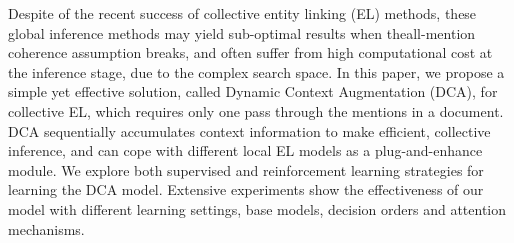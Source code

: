 Despite of the recent success of collective entity linking (EL) methods, these global inference methods may yield sub-optimal results when theall-mention coherence assumption breaks, and often suffer from high computational cost at the inference stage, due to the complex search space. In this paper, we propose a simple yet effective solution, called Dynamic Context Augmentation (DCA), for collective EL, which requires only one pass through the mentions in a document. DCA sequentially accumulates context information to make efficient, collective inference, and can cope with different local EL models as a plug-and-enhance module. We explore both supervised and reinforcement learning strategies for learning the DCA model. Extensive experiments show the effectiveness of our model with different learning settings, base models, decision orders and attention mechanisms.
